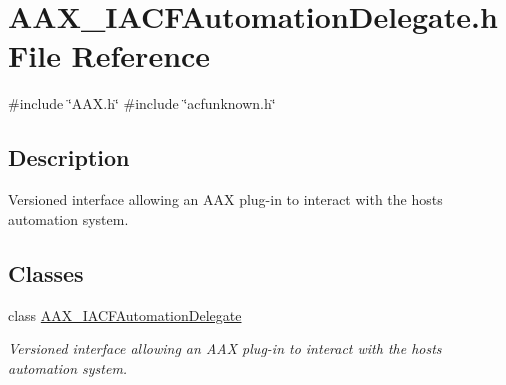 \hypertarget{a00506}{}\section{A\+A\+X\+\_\+\+I\+A\+C\+F\+Automation\+Delegate.\+h File Reference}
\label{a00506}
{\ttfamily \#include \char`\"{}A\+A\+X.\+h\char`\"{}}\newline
{\ttfamily \#include \char`\"{}acfunknown.\+h\char`\"{}}\newline


\subsection{Description}
Versioned interface allowing an A\+AX plug-\/in to interact with the host\textquotesingle{}s automation system. 

\subsection*{Classes}
\begin{DoxyCompactItemize}
\item 
class \mbox{\hyperlink{a01617}{A\+A\+X\+\_\+\+I\+A\+C\+F\+Automation\+Delegate}}
\begin{DoxyCompactList}\small\item\em Versioned interface allowing an A\+AX plug-\/in to interact with the host\textquotesingle{}s automation system. \end{DoxyCompactList}\end{DoxyCompactItemize}

